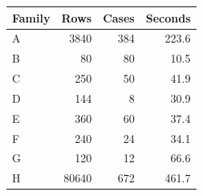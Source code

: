 \begin{tabular}{lrrr}
\toprule
Family & Rows & Cases & Seconds \\
\midrule
A & 3840 & 384 & 223.6 \\
B & 80 & 80 & 10.5 \\
C & 250 & 50 & 41.9 \\
D & 144 & 8 & 30.9 \\
E & 360 & 60 & 37.4 \\
F & 240 & 24 & 34.1 \\
G & 120 & 12 & 66.6 \\
H & 80640 & 672 & 461.7 \\
\bottomrule
\end{tabular}
